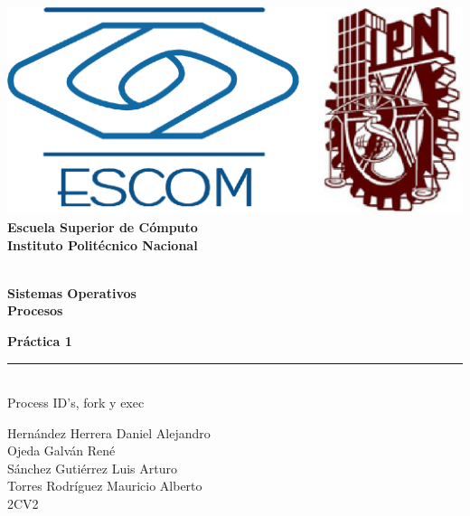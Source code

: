 
\begin{titlepage} %

    \begin{flushright}

	   \includegraphics[scale=0.15]{imagenes/escom-ipn.png}
	   \large \textbf{\\Escuela Superior de C\'omputo}
	   \large \textbf{\\Instituto Polit\'ecnico Nacional }%

	   \vspace{2.5cm} %

	   \large \textbf{\\Sistemas Operativos}%
	   \large \textbf{\\Procesos}%

	   \vspace{1.2cm} %

	   \large \textbf{Pr\'actica 1}\\%
	   \rule{6cm}{3pt} %
	   \large{\\ Process ID's, fork y exec} %

	   \vspace{2.5cm} %

	   Hernández Herrera Daniel Alejandro\\
	   Ojeda Galván René\\
	   Sánchez Gutiérrez Luis Arturo\\
	   Torres Rodríguez Mauricio Alberto \\ %
	   2CV2 %

	   \vspace{2.5cm} %

	   \date{\today}

    \end{flushright}

\end{titlepage}
